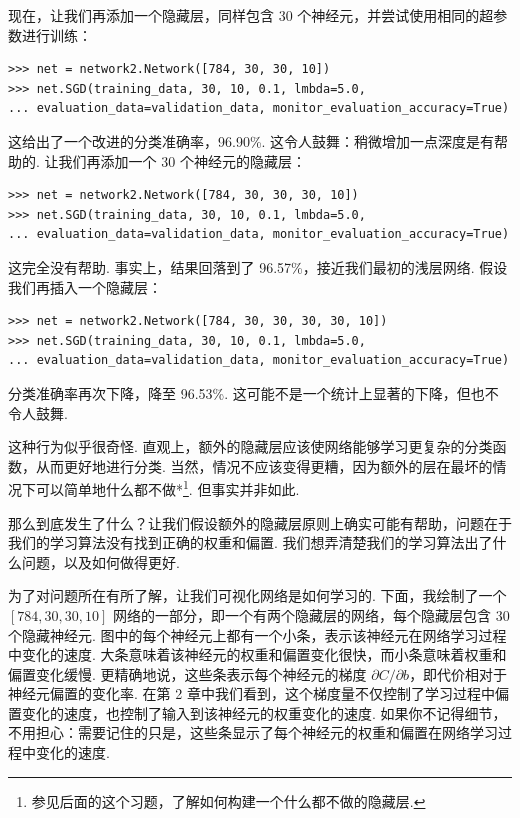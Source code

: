现在，让我们再添加一个隐藏层，同样包含 30 个神经元，并尝试使用相同的超参数进行训练：

\begin{lstlisting}
>>> net = network2.Network([784, 30, 30, 10])
>>> net.SGD(training_data, 30, 10, 0.1, lmbda=5.0,
... evaluation_data=validation_data, monitor_evaluation_accuracy=True)

\end{lstlisting}

这给出了一个改进的分类准确率，96.90\%. 这令人鼓舞：稍微增加一点深度是有帮助的. 让我们再添加一个 30 个神经元的隐藏层：

\begin{lstlisting}
>>> net = network2.Network([784, 30, 30, 30, 10])
>>> net.SGD(training_data, 30, 10, 0.1, lmbda=5.0,
... evaluation_data=validation_data, monitor_evaluation_accuracy=True)

\end{lstlisting}

这完全没有帮助. 事实上，结果回落到了 96.57\%，接近我们最初的浅层网络. 假设我们再插入一个隐藏层：

\begin{lstlisting}
>>> net = network2.Network([784, 30, 30, 30, 30, 10])
>>> net.SGD(training_data, 30, 10, 0.1, lmbda=5.0,
... evaluation_data=validation_data, monitor_evaluation_accuracy=True)

\end{lstlisting}

分类准确率再次下降，降至 96.53\%. 这可能不是一个统计上显著的下降，但也不令人鼓舞.

这种行为似乎很奇怪. 直观上，额外的隐藏层应该使网络能够学习更复杂的分类函数，从而更好地进行分类. 当然，情况不应该变得更糟，因为额外的层在最坏的情况下可以简单地什么都不做*\footnote{参见后面的这个习题，了解如何构建一个什么都不做的隐藏层.}. 但事实并非如此.

那么到底发生了什么？让我们假设额外的隐藏层原则上确实可能有帮助，问题在于我们的学习算法没有找到正确的权重和偏置. 我们想弄清楚我们的学习算法出了什么问题，以及如何做得更好.

为了对问题所在有所了解，让我们可视化网络是如何学习的. 下面，我绘制了一个 $[784, 30, 30, 10]$ 网络的一部分，即一个有两个隐藏层的网络，每个隐藏层包含 $30$ 个隐藏神经元. 图中的每个神经元上都有一个小条，表示该神经元在网络学习过程中变化的速度. 大条意味着该神经元的权重和偏置变化很快，而小条意味着权重和偏置变化缓慢. 更精确地说，这些条表示每个神经元的梯度 $\partial C / \partial b$，即代价相对于神经元偏置的变化率. 在第 2 章中我们看到，这个梯度量不仅控制了学习过程中偏置变化的速度，也控制了输入到该神经元的权重变化的速度. 如果你不记得细节，不用担心：需要记住的只是，这些条显示了每个神经元的权重和偏置在网络学习过程中变化的速度.

